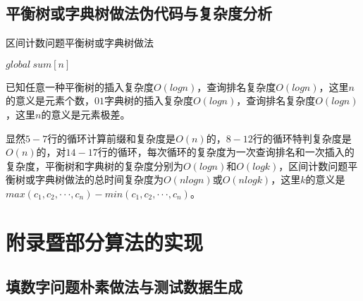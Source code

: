 \documentclass{article}
\begin{document}
\subsection{平衡树或字典树做法伪代码与复杂度分析}

\begin{algorithm}[H]

\caption{区间计数问题平衡树或字典树做法}
\LinesNumbered
{}

$global\ sum[n]$\;


\end{algorithm}

已知任意一种平衡树的插入复杂度$O(log n)$，查询排名复杂度$O(log n)$，这里$n$的意义是元素个数，$01$字典树的插入复杂度$O(log n)$，查询排名复杂度$O(log n)$，这里$n$的意义是元素极差。

显然$5-7$行的循环计算前缀和复杂度是$O(n)$的，$8-12$行的循环特判复杂度是$O(n)$的，对$14-17$行的循环，每次循环的复杂度为一次查询排名和一次插入的复杂度，平衡树和字典树的复杂度分别为$O(log n)$和$O(log k)$，区间计数问题平衡树或字典树做法的总时间复杂度为$O(n log n)$或$O(n log k)$，这里$k$的意义是$max(c_1,c_2,···,c_n)-min(c_1,c_2,···,c_n)$。

\section{附录暨部分算法的实现}

\subsection{填数字问题朴素做法与测试数据生成}

\end{document}
